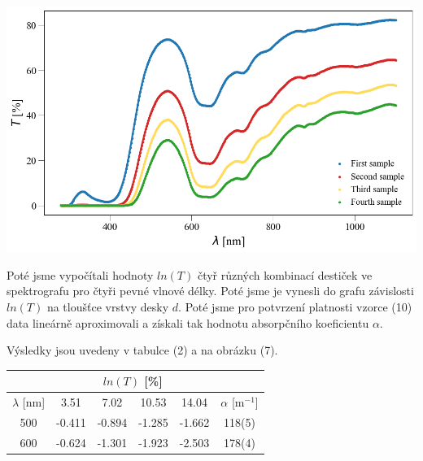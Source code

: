 \documentclass[a4paper,11pt]{article}
\begin{document}
    \begin{minipage}[t]{0.5\textwidth} 
                \vspace{-15pt}   
                \par \centering
                \includegraphics[scale=0.35]{alam}
                \captionsetup{justification=centering, font=footnotesize}
                \label{fig:alam}
                \vspace{10pt}
                \raggedright
                \par Poté jsme vypočítali hodnoty $ln(T)$ čtyř různých kombinací destiček ve spektrografu pro čtyři pevné vlnové délky. Poté jsme je vynesli do grafu závislosti $ln(T)$ na tloušťce vrstvy desky $d$. Poté jsme pro potvrzení platnosti vzorce (10) data lineárně aproximovali a získali tak hodnotu absorpčního koeficientu $\alpha$. 
                \par Výsledky jsou uvedeny v tabulce (2) a na obrázku (7).
                \vspace{10pt}
                \par \centering
                \begin{tabular}{|c|c|c|c|c|c|}
                    \hline
                    \multicolumn{1}{|c}{} & \multicolumn{4}{|c|}{$ln(T)$ [\%]} &  \\
                    \hline
                    $\lambda$ [nm] & 3.51 & 7.02 & 10.53 & 14.04 & $\alpha$ [m$^{-1}$] \\
                    \hline
                    500 & -0.411 & -0.894 & -1.285 & -1.662 & 118(5) \\
                    \hline
                    600 & -0.624 & -1.301 & -1.923 & -2.503 & 178(4) \\

\end{tabular}
\end{minipage}
\end{document}

